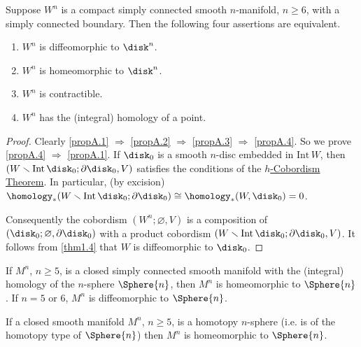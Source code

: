 \begin{proposition}\label{prop9.A}
	Suppose $W^n$ is a compact simply connected smooth $n$-manifold,
	$n\geq6$, with a simply connected boundary. Then the following
	four assertions are equivalent.
	\begin{enumerate}[label={\upshape{(A.\arabic*)}},leftmargin=1.5cm]
		\item\label{propA.1} $W^n$ is diffeomorphic to $\disk^n$.
		
		\item\label{propA.2} $W^n$ is homeomorphic to $\disk^n$.
		\item\label{propA.3} $W^n$ is contractible.
		\item\label{propA.4} $W^n$ has the (integral) homology of a point.
	\end{enumerate}
\end{proposition}
\begin{proof}
	Clearly \ref{propA.1} $\Rightarrow$ \ref{propA.2} $\Rightarrow$ \ref{propA.3} $\Rightarrow$ \ref{propA.4}.
    So we prove \ref{propA.4} $\Rightarrow$ \ref{propA.1}. If $\disk_0$ is a smooth $n$-disc embedded in $\mathrm{Int\,}W$, then $(W\smallsetminus
    \mathrm{Int\,}\disk_0 ; \partial\disk_0, V)$ satisfies the conditions of the \hyperref[thm9.1]{$h$-Cobordism Theorem}.
    In particular, (by excision) $\homology_*(W\smallsetminus
    \mathrm{Int\,}\disk_0 ; \partial\disk_0)\cong\homology_*(W,\disk_0)= 0$.
    
    Consequently the cobordism $(W^n; \varnothing, V)$ is a composition of
    $(\disk_0;\varnothing, \partial \disk_0)$ with a product cobordism $(W\smallsetminus
    \mathrm{Int\,}\disk_0; \partial\disk_0, V)$.
    It follows from \cref{thm1.4} that $W$ is diffeomorphic to $\disk_0$.
\end{proof}

\begin{proposition}\label{prop9.B}
 	If $M^n$, $n \geq 5$, is a closed simply connected smooth 
 	manifold with the (integral) homology of the $n$-sphere $\Sphere{n}$, then
 	$M^n$ is homeomorphic to $\Sphere{n}$. If $n =
 	5$ or $6$, $M^n$ is diffeomorphic to $\Sphere{n}$.
\end{proposition}

\begin{corollary}
	If a closed smooth manifold $M^n$, $n \geq 5$,  is a homotopy $n$-sphere (i.e. is of the homotopy type of $\Sphere{n}$) then $M^n$ is
	homeomorphic to $\Sphere{n}$.
\end{corollary}

